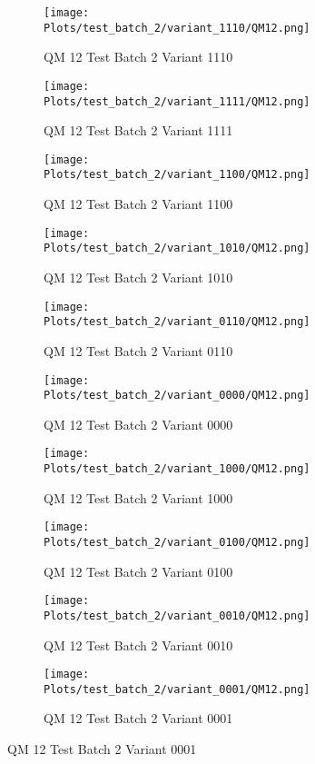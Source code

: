 \documentclass{DissertateFigs}
\begin{document}
\begin{figure}[t!]
    \begin{subfigure}{0.47\textwidth}
    \texttt{[image: Plots/test\_batch\_2/variant\_1110/QM12.png]}
    \caption{QM 12 Test Batch 2 Variant 1110}
    \end{subfigure}
    \begin{subfigure}{0.47\textwidth}
    \texttt{[image: Plots/test\_batch\_2/variant\_1111/QM12.png]}
    \caption{QM 12 Test Batch 2 Variant 1111}
    \end{subfigure}

\medskip

    \begin{subfigure}{0.47\textwidth}
    \texttt{[image: Plots/test\_batch\_2/variant\_1100/QM12.png]}
    \caption{QM 12 Test Batch 2 Variant 1100}
    \end{subfigure}
    \begin{subfigure}{0.47\textwidth}
    \texttt{[image: Plots/test\_batch\_2/variant\_1010/QM12.png]}
    \caption{QM 12 Test Batch 2 Variant 1010}
    \end{subfigure}

\medskip

    \begin{subfigure}{0.47\textwidth}
    \texttt{[image: Plots/test\_batch\_2/variant\_0110/QM12.png]}
    \caption{QM 12 Test Batch 2 Variant 0110}
    \end{subfigure}
    \begin{subfigure}{0.47\textwidth}
    \texttt{[image: Plots/test\_batch\_2/variant\_0000/QM12.png]}
    \caption{QM 12 Test Batch 2 Variant 0000}
    \end{subfigure}

\medskip

    \begin{subfigure}{0.47\textwidth}
    \texttt{[image: Plots/test\_batch\_2/variant\_1000/QM12.png]}
    \caption{QM 12 Test Batch 2 Variant 1000}
    \end{subfigure}
    \begin{subfigure}{0.47\textwidth}
    \texttt{[image: Plots/test\_batch\_2/variant\_0100/QM12.png]}
    \caption{QM 12 Test Batch 2 Variant 0100}
    \end{subfigure}

\medskip

    \begin{subfigure}{0.47\textwidth}
    \texttt{[image: Plots/test\_batch\_2/variant\_0010/QM12.png]}
    \caption{QM 12 Test Batch 2 Variant 0010}
    \end{subfigure}
    \begin{subfigure}{0.47\textwidth}
    \texttt{[image: Plots/test\_batch\_2/variant\_0001/QM12.png]}
    \caption{QM 12 Test Batch 2 Variant 0001}
    \end{subfigure}


\end{figure}
\end{document}
